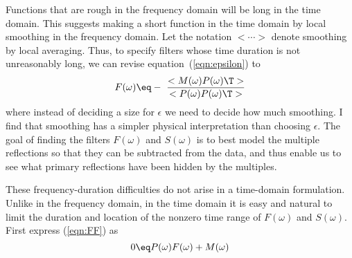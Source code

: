 \par
Functions that are rough in the frequency domain will be long in
the time domain. 
This suggests making a short function in the time domain
by local smoothing in the frequency domain.
Let the notation $< \cdots >$ denote smoothing by local averaging.
Thus,
to specify filters whose time duration is not unreasonably long,
we can revise equation~(\ref{eqn:epsilon}) to
\begin{equation}
F(\omega )\eq
- \ \frac{<M(\omega ) P(\omega )\T>}{<P(\omega )P(\omega )\T  >}
\label{eqn:smoothit}
\end{equation}
where
instead of deciding a size for $\epsilon$ we need to decide how much smoothing.
I find that smoothing has a simpler physical interpretation than choosing 
$\epsilon$.
The goal of finding the filters $F(\omega )$ and $S(\omega )$ is to
best model the multiple reflections so that they can
be subtracted from the data,
and thus enable us to see what primary reflections
have been hidden by the multiples.

\par
These frequency-duration difficulties do not arise in a time-domain formulation.
Unlike in the frequency domain,
in the time domain it is easy and natural
to limit the duration and location
of the nonzero time range of $F(\omega)$ and $S(\omega)$.
First express
(\ref{eqn:FF}) as
\begin{equation}
0 \eq P(\omega )F(\omega ) +M(\omega )  
\label{eqn:floor}
\end{equation}

